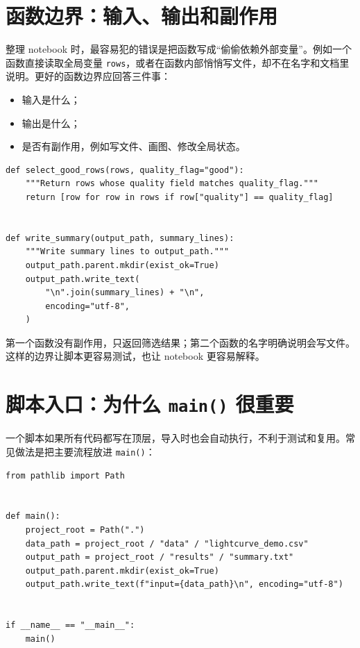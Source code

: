 \section{函数边界：输入、输出和副作用}

整理 notebook 时，最容易犯的错误是把函数写成“偷偷依赖外部变量”。例如一个函数直接读取全局变量 \texttt{rows}，或者在函数内部悄悄写文件，却不在名字和文档里说明。更好的函数边界应回答三件事：

\begin{itemize}
    \item 输入是什么；
    \item 输出是什么；
    \item 是否有副作用，例如写文件、画图、修改全局状态。
\end{itemize}

\begin{examplebox}[边界清楚的函数]
\begin{lstlisting}[style=pythonstyle]
def select_good_rows(rows, quality_flag="good"):
    """Return rows whose quality field matches quality_flag."""
    return [row for row in rows if row["quality"] == quality_flag]


def write_summary(output_path, summary_lines):
    """Write summary lines to output_path."""
    output_path.parent.mkdir(exist_ok=True)
    output_path.write_text(
        "\n".join(summary_lines) + "\n",
        encoding="utf-8",
    )
\end{lstlisting}
\end{examplebox}

第一个函数没有副作用，只返回筛选结果；第二个函数的名字明确说明会写文件。这样的边界让脚本更容易测试，也让 notebook 更容易解释。

\section{脚本入口：为什么 \texttt{main()} 很重要}

一个脚本如果所有代码都写在顶层，导入时也会自动执行，不利于测试和复用。常见做法是把主要流程放进 \texttt{main()}：

\begin{examplebox}[最小脚本入口]
\begin{lstlisting}[style=pythonstyle]
from pathlib import Path


def main():
    project_root = Path(".")
    data_path = project_root / "data" / "lightcurve_demo.csv"
    output_path = project_root / "results" / "summary.txt"
    output_path.parent.mkdir(exist_ok=True)
    output_path.write_text(f"input={data_path}\n", encoding="utf-8")


if __name__ == "__main__":
    main()
\end{lstlisting}
\end{examplebox}

